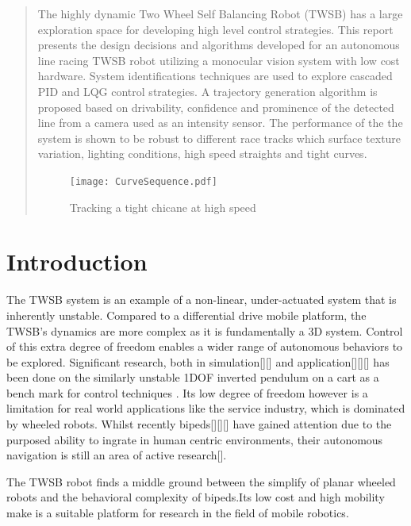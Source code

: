     \begin{abstract} %
    The highly dynamic Two Wheel Self Balancing Robot 
    (TWSB) has a large exploration space for developing high level 
    control strategies. 
    This report presents the design decisions and algorithms developed for
    an autonomous line racing TWSB robot utilizing a monocular vision system with low cost hardware. 
    System identifications techniques are used to explore
    cascaded PID and LQG control strategies.
    A trajectory generation algorithm is proposed based on drivability, confidence 
    and prominence of the detected line from a camera used as an intensity sensor. 
    The performance of the the system is shown to be robust to different race tracks which
    surface texture variation, lighting conditions, high speed straights and tight curves. 

    \begin{figure}[H]
    \centering
    \texttt{[image: CurveSequence.pdf]}
    \caption{Tracking a tight chicane at high speed}
    \end{figure}

  \end{abstract}%
  \clearpage
    \section{Introduction}
    The TWSB system is an example of a non-linear, under-actuated system that is inherently unstable.
    Compared to a differential drive mobile platform, the TWSB's dynamics are more complex as
    it is fundamentally a 3D system. Control of this extra degree of freedom enables a wider range 
    of autonomous behaviors to be explored. Significant research, both in simulation[][] and application[][][] 
    has been done on the similarly unstable 1DOF inverted pendulum on a cart as a bench mark for control techniques \cite{boubaker2013inverted}. 
    Its low degree of freedom however is a limitation for real world applications like the service industry, 
    which is dominated by wheeled robots. Whilst recently bipeds[][][] have gained attention 
    due to the purposed ability to ingrate in human centric environments, 
    their autonomous navigation is still an area of active research[]. 
    
    The TWSB robot finds a middle ground between the simplify of planar wheeled robots and the
    behavioral complexity of bipeds.Its low cost and high mobility make is a suitable platform 
    for research in the field of mobile robotics.
    

